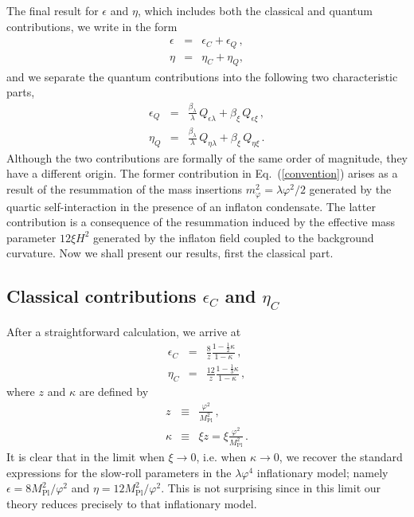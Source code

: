 The final result for $\epsilon$ and $\eta$, which includes both
the classical and quantum contributions, we write in the form
\begin{eqnarray}
\epsilon &=& \epsilon_C + \epsilon_Q\,,\nonumber\\
\eta &=& \eta_C + \eta_Q,
\end{eqnarray}
and we separate the quantum contributions into the following
two characteristic parts,
\begin{eqnarray}
\epsilon_Q &=& \frac{\beta_{\lambda}}{\lambda}\,Q_{\epsilon\lambda}
            + \beta_{\xi}\,Q_{\epsilon\xi}\,,\nonumber\\
    \eta_Q &=& \frac{\beta_{\lambda}}{\lambda}\,Q_{\eta\lambda} +
               \beta_{\xi}\,Q_{\eta\xi}
\,.
\label{convention}
\end{eqnarray}
Although the two contributions are formally of the same order of magnitude,
they have a different origin. The former contribution
in Eq.~(\ref{convention}) arises as a result of
the resummation of the mass insertions
$m_\varphi^2 =\lambda\varphi^2/2$ generated by the quartic self-interaction
in the presence of an inflaton condensate. The latter contribution
is a consequence of the resummation induced by the effective mass parameter
$12\xi H^2$ generated by the inflaton field coupled to the background
curvature. Now we shall present our results, first the classical part.

\subsection{Classical contributions $\epsilon_C$ and $\eta_C$}

After a straightforward calculation, we arrive at
\begin{eqnarray}
\epsilon_C &=&
\frac{8}{z}\frac{1-\frac12\kappa}{1-\kappa}\,,\nonumber\\
\eta_C &=& \frac{12}{z}\frac{1-\frac13\kappa}{1-\kappa}\,,
\label{classical}
\end{eqnarray}
where $z$ and $\kappa$ are defined by
\begin{eqnarray}
z &\equiv& \frac{\varphi^2}{M_{\mathrm{Pl}}^2}\,,\nonumber\\
\kappa &\equiv& \xi z = \xi\frac{\varphi^2}{M_{\mathrm{Pl}}^2} \,.
\label{zkappa}
\end{eqnarray}
It is clear that in the limit when $\xi\rightarrow 0$, i.e. when
$\kappa\rightarrow 0$, we recover the standard expressions for the
slow-roll parameters in the $\lambda\varphi^4$ inflationary model;
namely $\epsilon = 8{M_{\mathrm{Pl}}^2}/{\varphi^2}$ and
$\eta = 12{M_{\mathrm{Pl}}^2}/{\varphi^2}$. This is not surprising
since in this limit our theory reduces precisely to that inflationary model.

